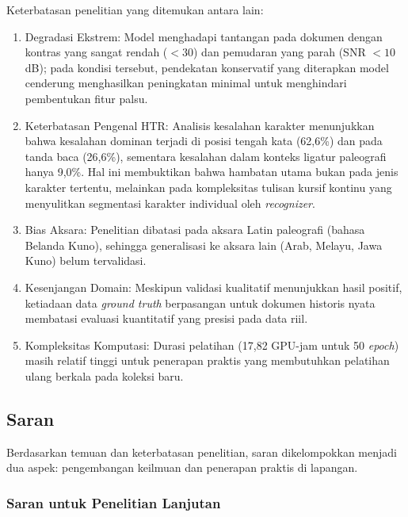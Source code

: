 Keterbatasan penelitian yang ditemukan antara lain:
\begin{enumerate}[leftmargin=1.5em, labelsep=0.5em, itemindent=0pt, noitemsep, topsep=0pt, partopsep=0pt]
  \item Degradasi Ekstrem: Model menghadapi tantangan pada dokumen dengan kontras yang sangat rendah ($<30$) dan pemudaran yang parah (SNR $< 10$ dB); pada kondisi tersebut, pendekatan konservatif yang diterapkan model cenderung menghasilkan peningkatan minimal untuk menghindari pembentukan fitur palsu.
  \item Keterbatasan Pengenal HTR: Analisis kesalahan karakter menunjukkan bahwa kesalahan dominan terjadi di posisi tengah kata (62,6\%) dan pada tanda baca (26,6\%), sementara kesalahan dalam konteks ligatur paleografi hanya 9,0\%. Hal ini membuktikan bahwa hambatan utama bukan pada jenis karakter tertentu, melainkan pada kompleksitas tulisan kursif kontinu yang menyulitkan segmentasi karakter individual oleh \textit{recognizer}.
  \item Bias Aksara: Penelitian dibatasi pada aksara Latin paleografi (bahasa Belanda Kuno), sehingga generalisasi ke aksara lain (Arab, Melayu, Jawa Kuno) belum tervalidasi.
  \item Kesenjangan Domain: Meskipun validasi kualitatif menunjukkan hasil positif, ketiadaan data \textit{ground truth} berpasangan untuk dokumen historis nyata membatasi evaluasi kuantitatif yang presisi pada data riil.
  \item Kompleksitas Komputasi: Durasi pelatihan (17,82 GPU-jam untuk 50 \textit{epoch}) masih relatif tinggi untuk penerapan praktis yang membutuhkan pelatihan ulang berkala pada koleksi baru.
\end{enumerate}

\subsection{Saran}
\label{subsec:saran}


Berdasarkan temuan dan keterbatasan penelitian, saran dikelompokkan menjadi dua aspek: pengembangan keilmuan dan penerapan praktis di lapangan.

\subsubsection{Saran untuk Penelitian Lanjutan}
\label{subsubsec:saran-penelitian}

